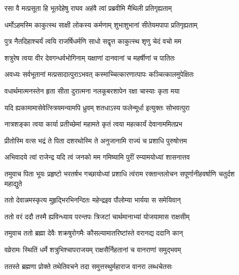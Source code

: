 
\twolineshloka
{रसा वै मत्प्रसूता हि भूतदेहेषु राघव}
{अहंवै त्वां प्रब्रवीमि मैथिली प्रतिगृह्यताम्}


\twolineshloka
{धर्मोऽहमस्मि काकुत्स्थ साक्षी लोकस्य कर्मणाम्}
{शुभाशुभानां सीतेयमपापा प्रतिगृह्यताम्}


\twolineshloka
{पुत्र नैतदिहाश्चर्यं त्वयि राजर्षिधर्मणि}
{साधो सद्वृत्त काकुत्स्थ शृणु चेदं वचो मम}

\twolineshloka
{शत्रुरेष त्वया वीर देवगन्धर्वभोगिनाम्}
{यक्षाणां दानवानां च महर्षीणां च पातितः}

\twolineshloka
{अवध्यः सर्वभूतानां मत्प्रसादात्पुराऽभवत्}
{कस्माच्चित्कारणात्पापः कञ्चित्कालमुपेक्षितः}


\twolineshloka
{वधार्थमात्मनस्तेन हृता सीता दुरात्मना}
{नलकूबरशापेन रक्षा चास्याः कृता मया}


\twolineshloka
{यदि ह्यकामामासेवेत्स्त्रियमन्यामपि ध्रुवम्}
{शतधाऽस्य फलेन्मूर्धा इत्युक्तः सोभवत्पुरा}


\twolineshloka
{नात्रशङ्का त्वया कार्या प्रतीच्छेमां महामते}
{कृतं त्वया महत्कार्यं देवानाममितप्रभ}



\twolineshloka
{प्रीतोस्मि वत्स भद्रं ते पिता दशरथोस्मि ते}
{अनुजानामि राज्यं च प्रशाधि पुरुषोत्तम}



\twolineshloka
{अभिवादये त्वां राजेन्द्र यदि त्वं जनको मम}
{गमिष्यामि पुरीं रम्यामयोध्यां शासनात्तव}



\threelineshloka
{तमुवाच पिता भूयः प्रहृष्टो भरतर्षभ}
{गच्छायोध्यां प्रशाधि त्वंराम रक्तान्तलोचन}
{सपूर्णानीहवर्षाणि चतुर्दश महाद्युते}


\twolineshloka
{ततो देवान्नमस्कृत्य मुहृद्भिरभिनन्दितः}
{महेन्द्रइव पौलोम्या भार्यया स समेयिवान्}


\twolineshloka
{ततो वरं ददौ तस्मै ह्यविन्ध्याय परन्तपः}
{त्रिजटां चार्थमानाभ्यां योजयामास राक्षसीम्}


\twolineshloka
{तमुवाच ततो ब्रह्मा देवैः शक्रषुरोगमैः}
{कौसल्यामातरिष्टांस्ते वरानद्य ददानि कान्}


\twolineshloka
{वव्रेरामः स्थितिं धर्मे शत्रुभिश्चापराजयम्}
{राक्षसैर्निहतानां च वानराणां समुद्भवम्}


\twolineshloka
{ततस्ते ब्रह्मणा प्रोक्ते तथेतिवचने तदा}
{समुत्तस्थुर्महाराज वानरा लब्धचेतसः}


